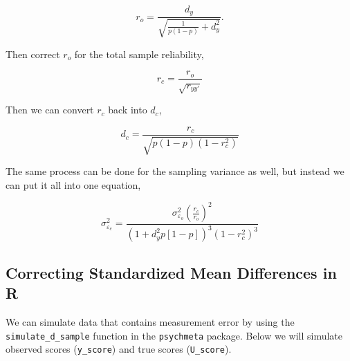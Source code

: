 \documentclass[
  letterpaper,
  DIV=11,
  numbers=noendperiod]{scrreprt}
\begin{document}
\[
r_o = \frac{d_y}{\sqrt{\frac{1}{p(1-p)}+d_y^2}}.
\]

Then correct \(r_o\) for the total sample reliability,

\[
r_c = \frac{r_o}{\sqrt{r_{yy'}}}
\]

Then we can convert \(r_c\) back into \(d_c\),

\[
d_c = \frac{r_c}{\sqrt{p(1-p)(1-r_c^2)}}
\]

The same process can be done for the sampling variance as well, but
instead we can put it all into one equation,

\[
\sigma^2_{\varepsilon_c} = \frac {\sigma^2_{\varepsilon_o}\left(\frac{r_c}{r_o}\right)^2} {\left(1+d_y^2p[1-p]\right)^3\left(1-r_c^2\right)^3}
\]

\hypertarget{correcting-standardized-mean-differences-in-r-1}{%
\subsection{Correcting Standardized Mean Differences in
R}\label{correcting-standardized-mean-differences-in-r-1}}

We can simulate data that contains measurement error by using the
\texttt{simulate\_d\_sample} function in the \texttt{psychmeta} package.
Below we will simulate observed scores (\texttt{y\_score}) and true
scores (\texttt{U\_score}).
\end{document}
